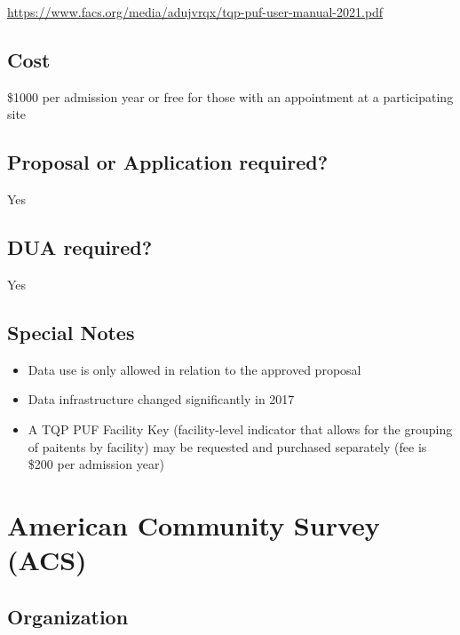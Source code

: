 \documentclass[
]{book}
\providecommand{\tightlist}{%
  \setlength{\itemsep}{0pt}\setlength{\parskip}{0pt}}
\begin{document}
\url{https://www.facs.org/media/adujvrqx/tqp-puf-user-manual-2021.pdf}

\hypertarget{cost-4}{%
\section{Cost}\label{cost-4}}

\$1000 per admission year or free for those with an appointment at a participating site

\hypertarget{proposal-or-application-required-4}{%
\section{Proposal or Application required?}\label{proposal-or-application-required-4}}

Yes

\hypertarget{dua-required-4}{%
\section{DUA required?}\label{dua-required-4}}

Yes

\hypertarget{special-notes-4}{%
\section{Special Notes}\label{special-notes-4}}

\begin{itemize}
\tightlist
\item
  Data use is only allowed in relation to the approved proposal
\item
  Data infrastructure changed significantly in 2017
\item
  A TQP PUF Facility Key (facility-level indicator that allows for the grouping of paitents by facility) may be requested and purchased separately (fee is \$200 per admission year)
\end{itemize}

\mainmatter

\hypertarget{american-community-survey-acs}{%
\chapter{American Community Survey (ACS)}\label{american-community-survey-acs}}

\hypertarget{organization-5}{%
\section{Organization}\label{organization-5}}
\end{document}

